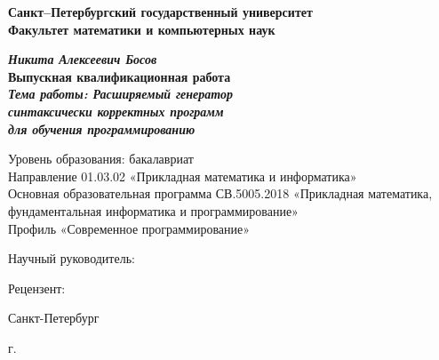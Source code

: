 \begin{titlepage}
\begin{center}

\textbf{Санкт--Петербургский государственный университет}\\
\textbf{Факультет математики и компьютерных наук}


\vspace{35mm}

\textbf{\textit{\large Никита Алексеевич Босов}} \\[8mm]
\textbf{\large Выпускная квалификационная работа}\\[3mm]
\textbf{\textit{\large Тема работы:  Расширяемый генератор\\синтаксически корректных программ\\для обучения программированию}}

\vspace{20mm}
Уровень образования: бакалавриат\\
Направление 01.03.02 «Прикладная математика и информатика»\\
Основная образовательная программа СВ.5005.2018
«Прикладная математика, фундаментальная информатика и программирование»\\
Профиль «Современное программирование»\\[25mm]


\begin{flushright}
\begin{minipage}[t]{0.65\textwidth}
{Научный руководитель:} \\
\vspace{10mm}

{Рецензент:} \\
\end{minipage}
\end{flushright}

\vfill

{Санкт-Петербург}
\par{\the\year{} г.}
\end{center}
\end{titlepage}
\restoregeometry
\addtocounter{page}{1}
